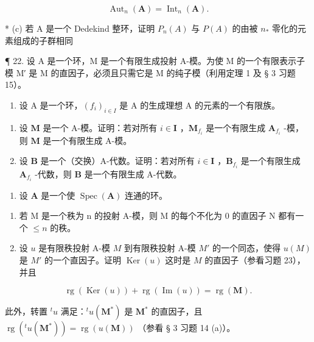 \[
\operatorname{Aut} _ {n} (\mathbf {A}) = \operatorname{Int} _ {n} (\mathbf {A}).
\]

* (c) 若 A 是一个 Dedekind 整环，证明 \(P_{n}(A)\) 与 \(P(A)\) 的由被 \(n_*\) 零化的元素组成的子群相同

¶ 22. 设 A 是一个环，M 是一个有限生成投射 A-模。为使 M 的一个有限表示子模 M′ 是 M 的直因子，必须且只需它是 M 的纯子模（利用定理 1 及 § 3 习题 15）。

\begin{enumerate}
\def\labelenumi{\arabic{enumi}.}
\setcounter{enumi}{22}
\tightlist
\item
  设 A 是一个环，\((f_i)_{i\in I}\) 是 A 的生成理想 A 的元素的一个有限族。
\end{enumerate}

\begin{enumerate}
\def\labelenumi{(\alph{enumi})}
\item
  设 \(\mathbf{M}\) 是一个 A-模。证明：若对所有 \(i\in \mathbf{I}\) ，\(\mathbf{M}_{f_i}\) 是一个有限生成 \(\mathbf{A}_{f_i}\) -模，则 \(\mathbf{M}\) 是一个有限生成 A-模。
\item
  设 \(\mathbf{B}\) 是一个（交换）A-代数。证明：若对所有 \(i\in \mathbf{I}\) ，\(\mathbf{B}_{f_i}\) 是一个有限生成 \(\mathbf{A}_{f_i}\) -代数，则 \(\mathbf{B}\) 是一个有限生成 A-代数。
\end{enumerate}

\begin{enumerate}
\def\labelenumi{\arabic{enumi}.}
\setcounter{enumi}{23}
\tightlist
\item
  设 \(\mathbf{A}\) 是一个使 \(\operatorname{Spec}(\mathbf{A})\) 连通的环。
\end{enumerate}

\begin{enumerate}
\def\labelenumi{(\alph{enumi})}
\item
  若 M 是一个秩为 n 的投射 A-模，则 M 的每个不化为 0 的直因子 N 都有一个 \(\leqslant n\) 的秩。
\item
  设 \(u\) 是有限秩投射 A-模 \(M\) 到有限秩投射 A-模 \(M'\) 的一个同态，使得 \(u(M)\) 是 \(M'\) 的一个直因子。证明 \(\operatorname{Ker}(u)\) 这时是 \(M\) 的直因子（参看习题 23），并且
\end{enumerate}

\[
\operatorname{rg} (\operatorname{Ker} (u)) + \operatorname{rg} (\operatorname{Im} (u)) = \operatorname{rg} (\mathbf {M}).
\]

此外，转置 \({}^t u\) 满足：\({}^t u(\mathbf{M}^*)\) 是 \(\mathbf{M}^*\) 的直因子，且 \(\operatorname{rg}({}^t u(\mathbf{M}^*)) = \operatorname{rg}(u(\mathbf{M}))\) （参看 § 3 习题 14 (a)）。

